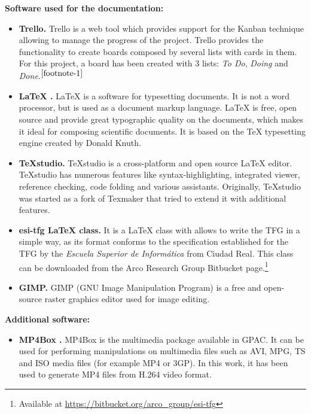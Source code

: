 \textbf{Software used for the documentation:}
\begin{itemize}
	\item \textbf{Trello.} Trello is a web tool which provides support for the Kanban technique allowing to manage the progress of the project. Trello provides the functionality to create boards composed by several lists with cards in them. For this project, a board has been created with 3 lists: \emph{To Do}, \emph{Doing} and \emph{Done}.$^{\ref{footnote-1}}$
	
	
	\item \textbf{\LaTeX{} \cite{Kot11}.} \LaTeX{} is a software for typesetting documents. It is not a word processor, but is used as a document markup language. \LaTeX{} is free, open source and provide great typographic quality on the documents, which makes it ideal for composing scientific documents. It is based on the \TeX{} typesetting engine created by Donald Knuth.
	
	\item \textbf{TeXstudio.} TeXstudio is a cross-platform and open source \LaTeX{} editor. TeXstudio has numerous features like syntax-highlighting, integrated viewer, reference checking, code folding and various assistants. Originally, TeXstudio was started as a fork of Texmaker that tried to extend it with additional features. 
	
	\item \textbf{esi-tfg \LaTeX{} class.} It is a \LaTeX{} class with allows to write the \ac{TFG} in a simple way, as its format conforms to the specification established for the \ac{TFG} by the \emph{Escuela Superior de Informática} from Ciudad Real. This class can be downloaded from the Arco Research Group Bitbucket page.\footnote{Available at \url{https://bitbucket.org/arco_group/esi-tfg}}
	
	\item \textbf{GIMP.} GIMP (\ac{GNU} Image Manipulation Program) is a free and open-source raster graphics editor used for image editing.
	
	
\end{itemize}

\textbf{Additional software:}
\begin{itemize}
	\item \textbf{MP4Box \cite{MP4Box}.} MP4Box is the multimedia package available in GPAC. It can be used for performing manipulations on multimedia files such as AVI, MPG, TS and ISO media files (for example MP4 or 3GP). In this work, it has been used to generate MP4 files from H.264 video format.
	
	
\end{itemize}
